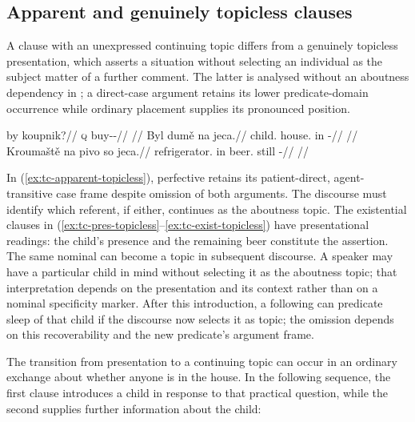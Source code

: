 \subsection{Apparent and genuinely topicless clauses}
\label{sec:tc-topicless}

A clause with an unexpressed continuing topic differs from a genuinely
 topicless presentation, which asserts a situation without selecting an
 individual as the subject matter of a further comment. The latter is
 analysed without an aboutness dependency in ; a direct-case
 argument retains its lower predicate-domain occurrence while ordinary
 placement supplies its pronounced position.

\pex\label{ex:tc-topicless}
\a\label{ex:tc-apparent-topicless}%
\begingl
\gla by koupnik?//
\glb \textsc{q} buy-\Trs{}-\Pf{}//
\glft {}
      //
\endgl
\a\label{ex:tc-pres-topicless}%
\begingl
\gla Byl dumě na jeca.//
\glb child.\Dir{} house.\Ind{} in \Exst{}-\Cont{}//
\glft {}
      //
\endgl
\a\label{ex:tc-exist-topicless}%
\begingl
\gla Kroumaště na pivo so jeca.//
\glb refrigerator.\Ind{} in beer.\Dir{} still \Exst{}-\Cont{}//
\glft {}
      //
\endgl
\xe

\noindent In (\ref{ex:tc-apparent-topicless}), perfective 
 retains its patient-direct, agent-transitive case frame despite omission of
 both arguments. The discourse must identify which referent, if either,
 continues as the aboutness topic. The existential clauses in
 (\ref{ex:tc-pres-topicless}--\ref{ex:tc-exist-topicless}) have presentational
 readings: the child's presence and the remaining beer constitute the
 assertion. The same nominal can become a topic in subsequent discourse.
 A speaker may have a particular child in mind without selecting it as the
 aboutness topic; that interpretation depends on the presentation and its
 context rather than on a nominal specificity marker. After this introduction,
 a following   can predicate sleep of that
 child if the discourse now selects it as topic; the omission depends on
 this recoverability and the new predicate's argument frame.

The transition from presentation to a continuing topic can occur in an
ordinary exchange about whether anyone is in the house. In the following
sequence, the first clause introduces a child in response to that practical
question, while the second supplies further information about the child:

